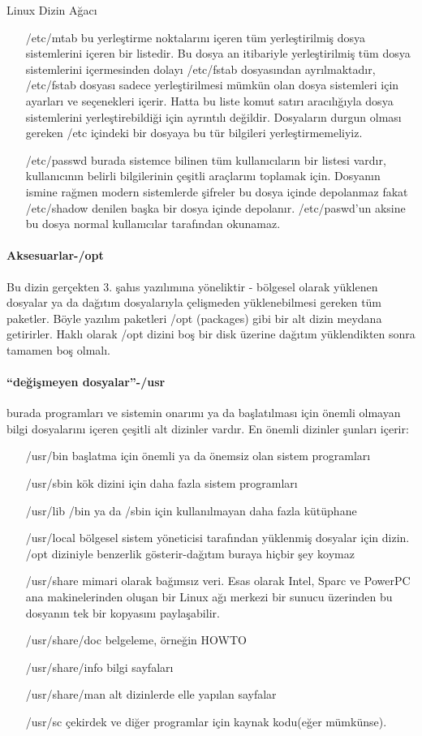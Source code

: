 \begin{section}{Linux Dizin Ağacı}
\begin{itemize}
\item[/etc/mtab]bu yerleştirme noktalarını içeren tüm yerleştirilmiş dosya sistemlerini içeren bir listedir. Bu dosya an itibariyle yerleştirilmiş tüm dosya sistemlerini içermesinden dolayı /etc/fstab dosyasından ayrılmaktadır, /etc/fstab dosyası sadece yerleştirilmesi mümkün olan dosya sistemleri için ayarları ve seçenekleri içerir. Hatta bu liste komut satırı aracılığıyla dosya sistemlerini yerleştirebildiği için ayrıntılı değildir.
Dosyaların durgun olması gereken /etc içindeki bir dosyaya bu tür bilgileri yerleştirmemeliyiz.
\item[/etc/passwd]burada sistemce bilinen tüm kullanıcıların bir listesi vardır, kullanıcının belirli bilgilerinin çeşitli araçlarını toplamak için. Dosyanın ismine rağmen modern sistemlerde şifreler bu dosya içinde depolanmaz fakat /etc/shadow denilen başka bir dosya içinde depolanır. /etc/paswd’un aksine bu dosya normal kullanıcılar tarafından okunamaz.
\end{itemize}

\paragraph{Aksesuarlar-/opt}{Bu dizin gerçekten 3. şahıs yazılımına yöneliktir - bölgesel olarak yüklenen dosyalar ya da dağıtım dosyalarıyla çelişmeden yüklenebilmesi gereken tüm paketler. Böyle yazılım paketleri /opt (packages)  gibi bir alt dizin meydana getirirler. Haklı olarak /opt dizini boş bir disk üzerine dağıtım yüklendikten sonra tamamen boş olmalı.}

\paragraph{“değişmeyen dosyalar”-/usr}{burada programları ve sistemin onarımı ya da başlatılması için önemli olmayan bilgi dosyalarını içeren çeşitli alt dizinler vardır. En önemli dizinler şunları içerir:}
\begin{itemize}
\item[/usr/bin] başlatma için önemli ya da önemsiz olan sistem programları
\item[/usr/sbin] kök dizini için daha fazla sistem programları
\item[/usr/lib] /bin ya da /sbin için kullanılmayan daha fazla kütüphane
\item[/usr/local] bölgesel sistem yöneticisi tarafından yüklenmiş dosyalar için dizin. /opt diziniyle benzerlik gösterir-dağıtım buraya hiçbir şey koymaz
\item[/usr/share]mimari olarak bağımsız veri. Esas olarak Intel, Sparc ve PowerPC ana makinelerinden oluşan bir Linux ağı merkezi bir sunucu üzerinden bu dosyanın tek bir kopyasını paylaşabilir.
\item[/usr/share/doc]belgeleme, örneğin HOWTO
\item[/usr/share/info]bilgi sayfaları
\item[/usr/share/man]alt dizinlerde elle yapılan sayfalar
\item[/usr/sc]çekirdek ve diğer programlar için kaynak kodu(eğer mümkünse).
\end{itemize}


\end{section}
